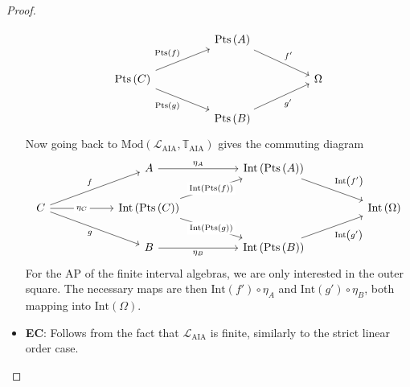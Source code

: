 \documentclass[11pt %
              ]{article}
\newcommand{\unit}[1]{\eta_{#1}}
\newcommand{\lang}{\mathcal{L}}
\newcommand{\theory}{\mathbb{T}}
\newcommand{\laia}{\lang_\text{AIA}}
\newcommand{\taia}{\theory_\text{AIA}}
\newcommand{\mods}[2]{\text{Mod}\left(#1,#2\right)}
\newcommand{\aias}{\mods{\laia}{\taia}}
\newcommand{\inter}[1][-]{\text{Int}\left(#1\right)}
\newcommand{\points}[1][-]{\text{Pts}\left(#1\right)}
\theoremstyle{plain}
\theoremstyle{definition}
\theoremstyle{remark}
\begin{document}
\begin{proof}
\begin{itemize}
      \[\begin{tikzcd}
        && {\points[A]} \\
        {\points[C]} &&&& \Omega \\
        && {\points[B]}
        \arrow["{\points[f]}", from=2-1, to=1-3]
        \arrow["{\points[g]}"', from=2-1, to=3-3]
        \arrow["{f'}", from=1-3, to=2-5]
        \arrow["{g'}"', from=3-3, to=2-5]
      \end{tikzcd}\]
      Now going back to $\aias$ gives the commuting diagram
      \[\begin{tikzcd}
        {} & {} & A && {\inter[\points[A]]} \\
        C && {\inter[\points[C]]} &&&& {\inter[\Omega]} \\
        && B && {\inter[\points[B]]}
        \arrow["{\inter[\points[f]]}"{description}, from=2-3, to=1-5]
        \arrow["{\inter[\points[g]]}"{description}, from=2-3, to=3-5]
        \arrow["{\inter[f']}", from=1-5, to=2-7]
        \arrow["{\inter[g']}"', from=3-5, to=2-7]
        \arrow["{\unit{B}}"', from=3-3, to=3-5]
        \arrow["{\unit{A}}", from=1-3, to=1-5]
        \arrow["{\unit{C}}"{description}, from=2-1, to=2-3]
        \arrow["f", from=2-1, to=1-3]
        \arrow["g"', from=2-1, to=3-3]
      \end{tikzcd}\]
      For the AP of the finite interval algebras, we are only interested in the outer square. The
      necessary maps are then $\inter[f'] \circ \unit{A}$ and $\inter[g'] \circ \unit{B}$, both
      mapping into $\inter[\Omega]$.
    \item \textbf{EC}: Follows from the fact that $\laia$ is finite, similarly to the strict linear
      order case.
\end{itemize}
\end{proof}
\end{document}
